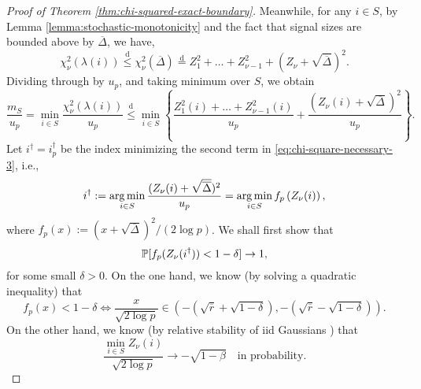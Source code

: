 \begin{proof}[Proof of Theorem \ref{thm:chi-squared-exact-boundary}]
Meanwhile, for any $i\in S$, by Lemma \ref{lemma:stochastic-monotonicity} and the fact that signal sizes are bounded above by $\overline{\Delta}$, we have,
\begin{equation*}
    {\chi_\nu^2(\lambda(i))} \stackrel{\mathrm{d}}{\le}
    {\chi_\nu^2(\overline{\Delta})} \stackrel{\mathrm{d}}{=} 
    {Z_1^2 + \ldots + Z_{\nu-1}^2 + \left(Z_\nu + \sqrt{\overline{\Delta}}\right)^2}.
\end{equation*}
Dividing through by $u_p$, and taking minimum over $S$, we obtain
\begin{equation} \label{eq:chi-square-necessary-3}
    \frac{m_S}{u_p} 
    = \min_{i\in S} \frac{\chi_\nu^2(\lambda(i))}{u_p} 
    \stackrel{\mathrm{d}}{\le} 
    \min_{i\in S}\left\{\frac{Z_1^2(i) + \ldots + Z_{\nu-1}^2(i)}{u_p} + \frac{(Z_\nu(i) + \sqrt{\overline{\Delta}})^2}{u_p}\right\}.
\end{equation}
Let $i^\dagger = i^\dagger_p$ be the index minimizing the second term in \eqref{eq:chi-square-necessary-3}, i.e.,
\begin{equation}
    i^\dagger := \argmin_{i\in S} \frac{(Z_\nu(i) + \sqrt{\overline{\Delta}})^2}{u_p}
    = \argmin_{i\in S} f_p\left(Z_\nu(i)\right),
\end{equation}
where $f_p(x):=(x+\sqrt{\overline{\Delta}})^2/(2\log{p})$. 
We shall first show that 
\begin{equation} \label{eq:chi-square-necessary-4}
    \P[ f_p(Z_\nu(i^\dagger)) < 1 -\delta ] \to 1,
\end{equation}
for some small $\delta>0$.
On the one hand, we know (by solving a quadratic inequality) that
\begin{equation} \label{eq:chi-square-necessary-5}
    f_p(x)<1-\delta \iff \frac{x}{\sqrt{2\log{p}}} \in (-(\sqrt{\overline{r}}+\sqrt{1-\delta}), -(\sqrt{\overline{r}}-\sqrt{1-\delta})).
\end{equation}
On the other hand, we know (by relative stability of iid Gaussians \cite{gao2018fundamental}) that 
\begin{equation} \label{eq:chi-square-necessary-6}
    \frac{\min_{i\in S} Z_\nu(i)}{\sqrt{2\log{p}}}
    \to -\sqrt{1-\beta} \quad\text{in probability}.
\end{equation}

\end{proof}
